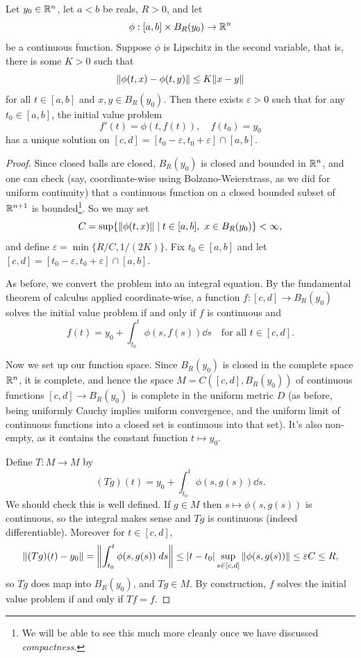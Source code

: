 \documentclass[a4paper]{scrartcl}
\begin{document}
\begin{theorem}
    Let $y_0 \in \mathbb{R}^n$, let $a < b$ be reals, $R > 0$, and let
    $$
    \phi: [a, b] \times B_R(y_0) \rightarrow \mathbb{R}^n
    $$
    be a continuous function. Suppose $\phi$ is Lipschitz in the second variable, that is, there is some $K > 0$ such that
    $$
    \norm{\phi(t, x) - \phi(t, y)} \leq K \norm{x - y}
    $$
    for all $t \in [a, b]$ and $x, y \in B_R(y_0)$. Then there exists $\varepsilon > 0$ such that for any $t_0 \in [a, b]$, the initial value problem
    $$
    f'(t) = \phi(t, f(t)), \quad f(t_0) = y_0
    $$
    has a unique solution on $[c, d] = [t_0 - \varepsilon, t_0 + \varepsilon] \cap [a, b]$.
\end{theorem}
\begin{proof}
    Since closed balls are closed, $B_R(y_0)$ is closed and bounded in $\mathbb{R}^n$, and one can check (say, coordinate-wise using Bolzano-Weierstrass, as we did for uniform continuity) that a continuous function on a closed bounded subset of $\mathbb{R}^{n+1}$ is bounded\footnote{We will be able to see this much more cleanly once we have discussed \emph{compactness}.}. So we may set
    $$
    C = \sup\{\norm{\phi(t, x)} \mid t \in [a, b],\ x \in B_R(y_0)\} < \infty,
    $$
    and define $\varepsilon = \min\{R/C, 1/(2K)\}$. Fix $t_0 \in [a, b]$ and let $[c, d] = [t_0 - \varepsilon, t_0 + \varepsilon] \cap [a, b]$.

    As before, we convert the problem into an integral equation. By the fundamental theorem of calculus applied coordinate-wise, a function $f: [c, d] \rightarrow B_R(y_0)$ solves the initial value problem if and only if $f$ is continuous and
    $$
    f(t) = y_0 + \int_{t_0}^t \phi(s, f(s)) \dd s \quad \text{for all } t \in [c, d].
    $$

    Now we set up our function space. Since $B_R(y_0)$ is closed in the complete space $\mathbb{R}^n$, it is complete, and hence the space $M = C([c, d], B_R(y_0))$ of continuous functions $[c, d] \rightarrow B_R(y_0)$ is complete in the uniform metric $D$ (as before, being uniformly Cauchy implies uniform convergence, and the uniform limit of continuous functions into a closed set is continuous into that set). It's also non-empty, as it contains the constant function $t \mapsto y_0$.

    Define $T: M \rightarrow M$ by
    $$
    (Tg)(t) = y_0 + \int_{t_0}^t \phi(s, g(s)) \dd s.
    $$
    We should check this is well defined. If $g \in M$ then $s \mapsto \phi(s, g(s))$ is continuous, so the integral makes sense and $Tg$ is continuous (indeed differentiable). Moreover for $t \in [c, d]$,
    $$
    \norm{(Tg)(t) - y_0} = \norm{\int_{t_0}^t \phi(s, g(s)) \; d s} \leq |t - t_0| \sup_{s \in [c,d]} \norm{\phi(s, g(s))} \leq \varepsilon C \leq R,
    $$
    so $Tg$ does map into $B_R(y_0)$, and $Tg \in M$. By construction, $f$ solves the initial value problem if and only if $Tf = f$.


\end{proof}
\end{document}
